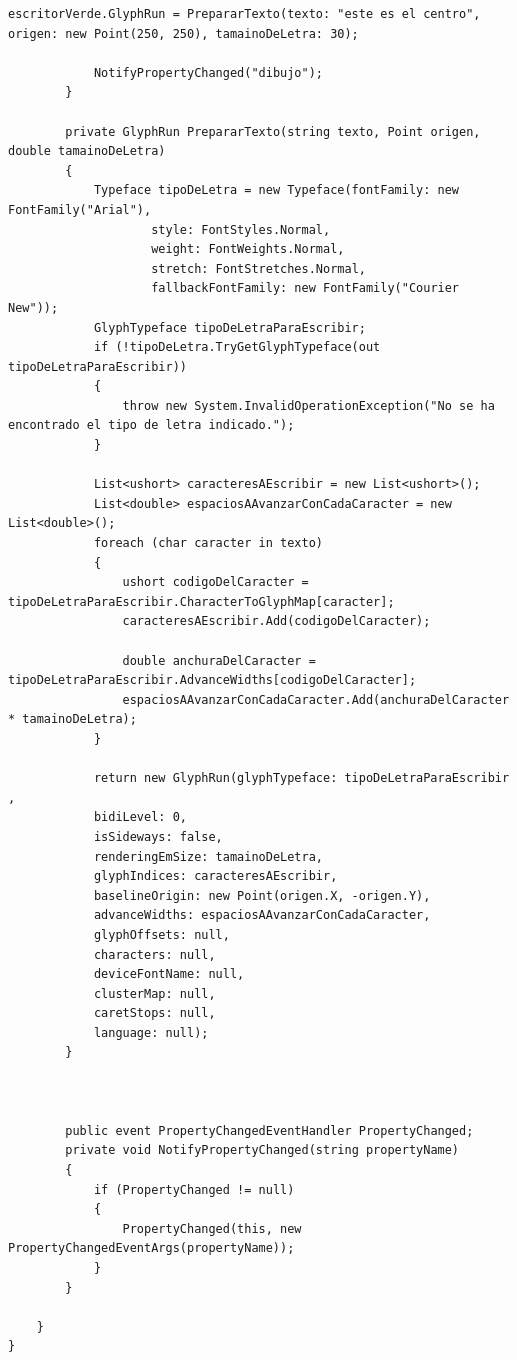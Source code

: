 \documentclass[spanish,12pt,a4paper,final,oneside]{book}
\begin{document}
\begin{lstlisting}[frame=single]
        	escritorVerde.GlyphRun = PrepararTexto(texto: "este es el centro", origen: new Point(250, 250), tamainoDeLetra: 30);
 
        	NotifyPropertyChanged("dibujo");
    	}
 
    	private GlyphRun PrepararTexto(string texto, Point origen, double tamainoDeLetra)
    	{
        	Typeface tipoDeLetra = new Typeface(fontFamily: new FontFamily("Arial"),
                    style: FontStyles.Normal,
	                weight: FontWeights.Normal,
                    stretch: FontStretches.Normal,
                    fallbackFontFamily: new FontFamily("Courier New"));
        	GlyphTypeface tipoDeLetraParaEscribir;
        	if (!tipoDeLetra.TryGetGlyphTypeface(out tipoDeLetraParaEscribir))
        	{
            	throw new System.InvalidOperationException("No se ha encontrado el tipo de letra indicado.");
        	}
 
        	List<ushort> caracteresAEscribir = new List<ushort>();
        	List<double> espaciosAAvanzarConCadaCaracter = new List<double>();
        	foreach (char caracter in texto)
        	{
            	ushort codigoDelCaracter = tipoDeLetraParaEscribir.CharacterToGlyphMap[caracter];
                caracteresAEscribir.Add(codigoDelCaracter);
 
            	double anchuraDelCaracter = tipoDeLetraParaEscribir.AdvanceWidths[codigoDelCaracter];
            	espaciosAAvanzarConCadaCaracter.Add(anchuraDelCaracter * tamainoDeLetra);
        	}
 
        	return new GlyphRun(glyphTypeface: tipoDeLetraParaEscribir ,
            bidiLevel: 0,
            isSideways: false,
            renderingEmSize: tamainoDeLetra,
            glyphIndices: caracteresAEscribir,
            baselineOrigin: new Point(origen.X, -origen.Y),
            advanceWidths: espaciosAAvanzarConCadaCaracter,
            glyphOffsets: null,
            characters: null,
            deviceFontName: null,
            clusterMap: null,
            caretStops: null,
            language: null);
    	}
 
 
 
    	public event PropertyChangedEventHandler PropertyChanged;
    	private void NotifyPropertyChanged(string propertyName)
    	{
        	if (PropertyChanged != null)
        	{
            	PropertyChanged(this, new PropertyChangedEventArgs(propertyName));
        	}
    	}
 
	}
}
\end{lstlisting}
\end{document}

